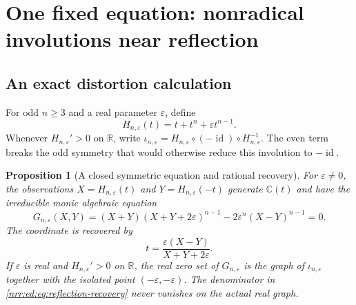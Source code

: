 \documentclass[11pt,letterpaper]{article}
\newtheorem{proposition}[theorem]{Proposition}
\theoremstyle{definition}
\theoremstyle{remark}
\newcommand{\R}{\mathbb R}
\newcommand{\C}{\mathbb C}
\newcommand{\id}{\operatorname{id}}
\newcommand{\eps}{\varepsilon}
\begin{document}
\section{One fixed equation: nonradical involutions near reflection}
\label{nrr:ed:sec:reflection}

\subsection{An exact distortion calculation}

For odd $n\ge3$ and a real parameter $\eps$, define
\begin{equation}
 H_{n,\eps}(t)=t+t^n+\eps t^{n-1}.
 \label{nrr:ed:eq:perturbed-coordinate}
\end{equation}
Whenever $H_{n,\eps}'>0$ on $\R$, write
$\iota_{n,\eps}=H_{n,\eps}\circ(-\id)\circ H_{n,\eps}^{-1}$.
The even term breaks the odd symmetry that would otherwise reduce this involution
to $-\id$.

\begin{proposition}[A closed symmetric equation and rational recovery]
\label{nrr:ed:prop:reflection-curve}
For $\eps\ne0$, the observations $X=H_{n,\eps}(t)$ and $Y=H_{n,\eps}(-t)$
generate $\C(t)$ and have the irreducible monic algebraic equation
\begin{equation}
 G_{n,\eps}(X,Y)
 =(X+Y)(X+Y+2\eps)^{n-1}-2\eps^n(X-Y)^{n-1}=0.
 \label{nrr:ed:eq:reflection-curve}
\end{equation}
The coordinate is recovered by
\begin{equation}
 t=\frac{\eps(X-Y)}{X+Y+2\eps}.
 \label{nrr:ed:eq:reflection-recovery}
\end{equation}
If $\eps$ is real and $H_{n,\eps}'>0$ on $\R$, the real zero set of $G_{n,\eps}$
is the graph of $\iota_{n,\eps}$ together with the isolated point
$(-\eps,-\eps)$. The denominator in \eqref{nrr:ed:eq:reflection-recovery} never
vanishes on the actual real graph.
\end{proposition}
\end{document}
